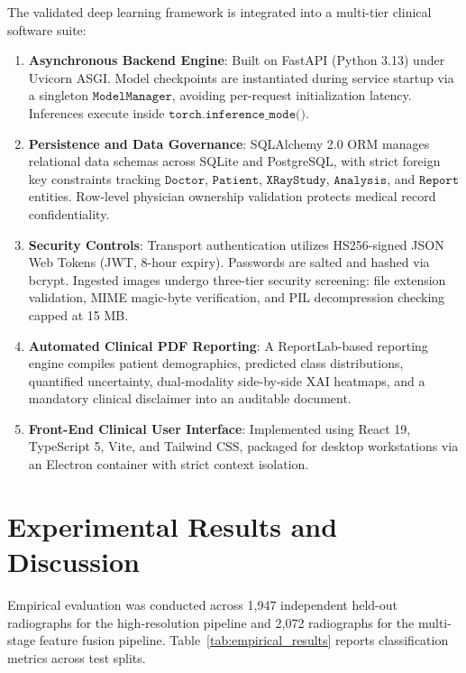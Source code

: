 \documentclass[journal]{IEEEtran}
\begin{document}
The validated deep learning framework is integrated into a multi-tier clinical software suite:
\begin{enumerate}
    \item \textbf{Asynchronous Backend Engine}: Built on FastAPI (Python 3.13) under Uvicorn ASGI. Model checkpoints are instantiated during service startup via a singleton $\texttt{ModelManager}$, avoiding per-request initialization latency. Inferences execute inside $\texttt{torch.inference\_mode()}$.
    \item \textbf{Persistence and Data Governance}: SQLAlchemy 2.0 ORM manages relational data schemas across SQLite and PostgreSQL, with strict foreign key constraints tracking $\texttt{Doctor}$, $\texttt{Patient}$, $\texttt{XRayStudy}$, $\texttt{Analysis}$, and $\texttt{Report}$ entities. Row-level physician ownership validation protects medical record confidentiality.
    \item \textbf{Security Controls}: Transport authentication utilizes HS256-signed JSON Web Tokens (JWT, 8-hour expiry). Passwords are salted and hashed via bcrypt. Ingested images undergo three-tier security screening: file extension validation, MIME magic-byte verification, and PIL decompression checking capped at 15 MB.
    \item \textbf{Automated Clinical PDF Reporting}: A ReportLab-based reporting engine compiles patient demographics, predicted class distributions, quantified uncertainty, dual-modality side-by-side XAI heatmaps, and a mandatory clinical disclaimer into an auditable document.
    \item \textbf{Front-End Clinical User Interface}: Implemented using React 19, TypeScript 5, Vite, and Tailwind CSS, packaged for desktop workstations via an Electron container with strict context isolation.
\end{enumerate}

\section{Experimental Results and Discussion}
\label{sec:results}

Empirical evaluation was conducted across 1,947 independent held-out radiographs for the high-resolution pipeline and 2,072 radiographs for the multi-stage feature fusion pipeline. Table~\ref{tab:empirical_results} reports classification metrics across test splits.
\end{document}
